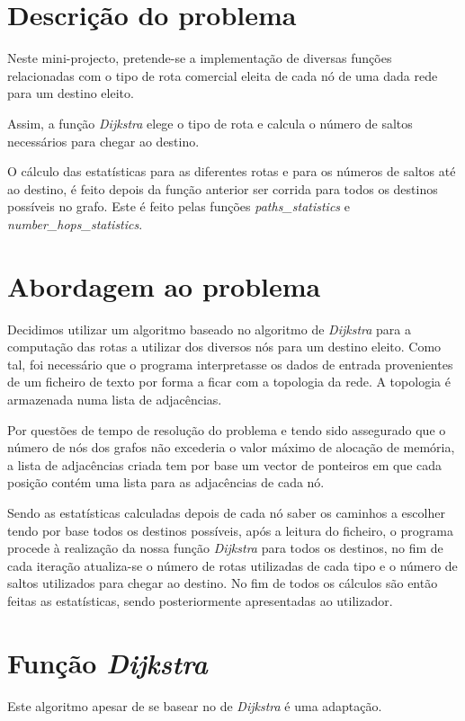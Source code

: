 \documentclass[a4paper]{article}
\begin{document}


\section{Descrição do problema}
Neste mini-projecto, pretende-se a implementação de diversas funções relacionadas com o tipo de rota comercial eleita de cada nó de uma dada rede para um destino eleito.

Assim, a função \textit{Dijkstra} elege o tipo de rota e calcula o número de saltos necessários para chegar ao destino.

O cálculo das estatísticas para as diferentes rotas e para os números de saltos até ao destino, é feito depois da função anterior ser corrida para todos os destinos possíveis no grafo. Este é feito pelas funções \textit{paths\_statistics} e \textit{number\_hops\_statistics}.

\section{Abordagem ao problema}
Decidimos utilizar um algoritmo baseado no algoritmo de \textit{Dijkstra} para a computação das rotas a utilizar dos diversos nós para um destino eleito. Como tal, foi necessário que o programa interpretasse os dados de entrada provenientes de um ficheiro de texto por forma a ficar com a topologia da rede. A topologia é armazenada numa lista de adjacências.

Por questões de tempo de resolução do problema e tendo sido assegurado que o número de nós dos grafos não excederia o valor máximo de alocação de memória, a lista de adjacências criada tem por base um vector de ponteiros em que cada posição contém uma lista para as adjacências de cada nó.

Sendo as estatísticas calculadas depois de cada nó saber os caminhos a escolher tendo por base todos os destinos possíveis, após a leitura do ficheiro, o programa procede à realização da nossa função \textit{Dijkstra} para todos os destinos, no fim de cada iteração atualiza-se o número de rotas utilizadas de cada tipo e o número de saltos utilizados para chegar ao destino. No fim de todos os cálculos são então feitas as estatísticas, sendo posteriormente apresentadas ao utilizador.

\section{Função \textit{Dijkstra}}
Este algoritmo apesar de se basear no de \textit{Dijkstra} é uma adaptação.
\end{document}
